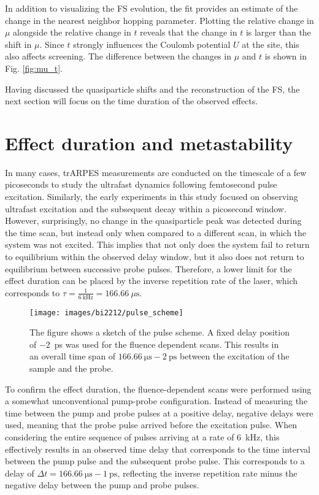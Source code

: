 In addition to visualizing the FS evolution, the fit provides an estimate of the change in the nearest neighbor hopping parameter.
Plotting the relative change in $\mu$ alongside the relative change in $t$ reveals that the change in $t$ is larger than the shift in $\mu$.
Since $t$ strongly influences the Coulomb potential $U$ at the  site, this also affects screening.
The difference between the changes in $\mu$ and $t$ is shown in Fig. \ref{fig:mu_t}.

Having discussed the quasiparticle shifts and the reconstruction of the FS, the next section will focus on the time duration of the observed effects.

\section{Effect duration and metastability}
\label{sec:meta}

In many cases, trARPES measurements are conducted on the timescale of a few picoseconds to study the ultrafast dynamics following femtosecond pulse excitation.
Similarly, the early experiments in this study focused on observing ultrafast excitation and the subsequent decay within a picosecond window.
However, surprisingly, no change in the quasiparticle peak was detected during the time scan, but instead only when compared to a different scan, in which the system was not excited.
This implies that not only does the system fail to return to equilibrium within the observed delay window, but it also does not return to equilibrium between successive probe pulses.
Therefore, a lower limit for the effect duration can be placed by the inverse repetition rate of the laser, which corresponds to $\tau=\frac{1}{\qty{6}{\kilo\hertz}}=\qty{166.66}{\mu\second}$.

\begin{figure}
	\centering
	\texttt{[image: images/bi2212/pulse\_scheme]}
	\caption{The figure shows a sketch of the pulse scheme. A fixed delay position of \qty{-2}{\pico\second} was used for the fluence dependent scans. This results in an overall time span of $\qty{166.66}{\micro\second}-\qty{2}{\pico\second}$ between the excitation of the sample and the probe.}
	\label{fig:pulsescheme}
\end{figure}

To confirm the effect duration, the fluence-dependent scans were performed using a somewhat unconventional pump-probe configuration.
Instead of measuring the time between the pump and probe pulses at a positive delay, negative delays were used, meaning that the probe pulse arrived before the excitation pulse.
When considering the entire sequence of pulses arriving at a rate of \qty{6}{\kilo\hertz}, this effectively results in an observed time delay that corresponds to the time interval between the pump pulse and the subsequent probe pulse.
This corresponds to a delay of $\Delta t = \qty{166.66}{\micro\second} - \qty{1}{\pico\second}$, reflecting the inverse repetition rate minus the negative delay between the pump and probe pulses.


